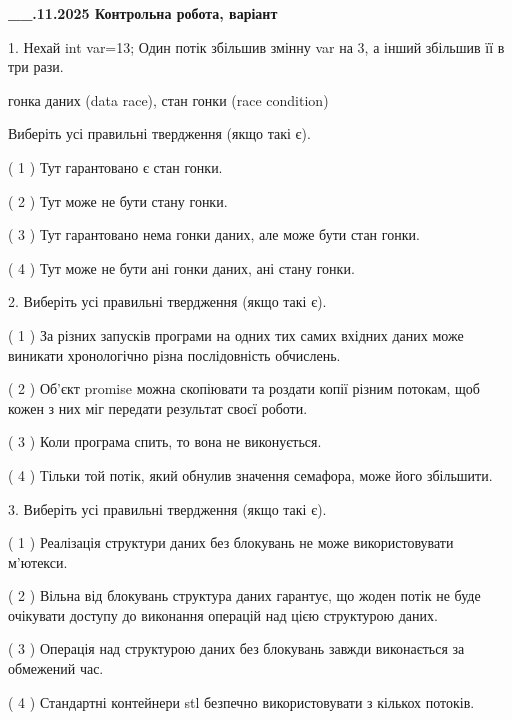 \documentclass[12pt, ukrainian]{article}
\begin{document}
\newpage
\begin {large}

\textbf{\_\_.11.2025 Контрольна робота, варіант  }\par


{
1. Нехай int var=13; Один потік збільшив змінну var на 3, а інший збільшив її в три рази.

гонка даних (data race), стан гонки (race condition)

Виберіть усі правильні твердження (якщо такі є).\par
\vspace{2mm}
( 1 ) Тут гарантовано є стан гонки.%

( 2 ) Тут може не бути стану гонки.%

( 3 ) Тут гарантовано нема гонки даних, але може бути стан гонки.%

( 4 ) Тут може не бути ані гонки даних, ані стану гонки.%


2. Виберіть усі правильні твердження (якщо такі є).\par
\vspace{2mm}

( 1 ) За різних запусків програми на одних тих самих вхідних даних може виникати хронологічно різна послідовність обчислень.%

( 2 ) Об’єкт promise можна скопіювати та роздати копії різним потокам, щоб кожен з них міг передати результат своєї роботи.%

( 3 ) Коли програма спить, то вона не виконується.%

( 4 ) Тільки той потік, який обнулив значення семафора, може його збільшити.%


3. Виберіть усі правильні твердження (якщо такі є).\par
\vspace{2mm}

( 1 ) Реалізація структури даних без блокувань не може використовувати м’ютекси.%

( 2 ) Вільна від блокувань структура даних гарантує, що жоден потік не буде очікувати доступу до виконання операцій над цією структурою даних.%

( 3 ) Операція над структурою даних без блокувань завжди виконається за обмежений час.%

( 4 ) Стандартні контейнери stl безпечно використовувати з кількох потоків.%


}
\end{large}
\end{document}
